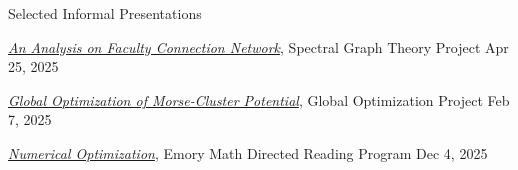 \documentclass[10pt, letterpaper]{resume} %
\begin{document}
\begin{rSection}{Selected Informal Presentations}  
\begin{rSubsection}{}{}{}{}
\item \href{https://www.dropbox.com/scl/fi/cau0hc4erhg0amyyfme8o/Spectral_Graph_Theory_Jiuru_Lyu.pdf?rlkey=mbcigxfeqv8e4vlk3cn97zrvn&st=5hlxdzf8&dl=0}{\textit{An Analysis on Faculty Connection Network}}, Spectral Graph Theory Project \hfill Apr 25, 2025
\item \href{https://www.dropbox.com/scl/fi/tvpx670nijy8lwamxlvnd/Global_Optimization_Jiuru_Lyu.pdf?rlkey=hxpo4xxkzwubmb2lestimqs8k&st=66eovify&dl=0}{\textit{Global Optimization of Morse-Cluster Potential}}, Global Optimization Project \hfill Feb 7, 2025 
\item \href{https://www.dropbox.com/scl/fi/czpae3nk0h61b4mmwbiid/MATH498R_Presentation_Fall24_Jiuru-Lyu.pdf?rlkey=rrvxbr4u8ekfmjep7r5rd99uh&st=mttmtbxy&dl=0}{\textit{Numerical Optimization}}, Emory Math Directed Reading Program \hfill Dec 4, 2025
\end{rSubsection}
\end{rSection}
  
\label{LastPage}
\end{document}
